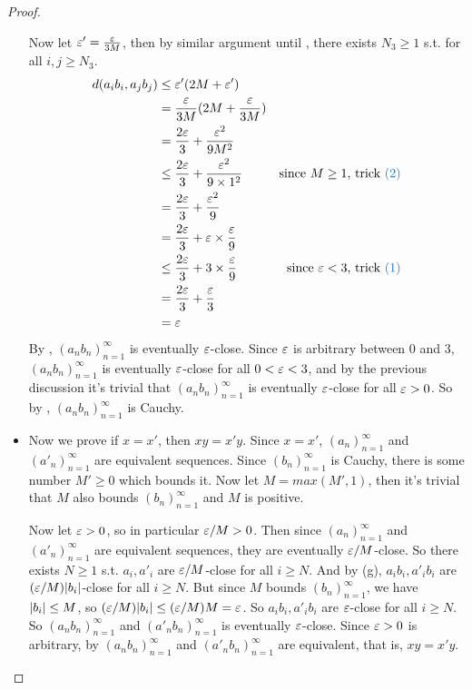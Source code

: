 \begin{proof}
\begin{itemize}
        \sloppy Now let \(\varepsilon' = \frac{\varepsilon}{3M}\), then by similar argument until ,
        there exists \(N_3 \ge 1\) s.t. for all \(i, j \ge N_3\).
        \begin{align*}
            d(a_i b_i, a_j b_j) & \le \varE'(2M + \varE') \\
                                & = \frac{\varE}{3M}(2M + \frac{\varE}{3M}) \\
                                & = \frac{2\varE}{3} + \frac{\varE^2}{9M^2} \\
                                & \le \frac{2\varE}{3} + \frac{\varE^2}{9\X1^2} & \text{since \(M \ge 1\), trick \BLUE{(2)}} \\
                                & = \frac{2\varE}{3} + \frac{\varE^2}{9} \\
                                & = \frac{2\varE}{3} + \varE \X \frac{\varE}{9} \\
                                & \le \frac{2\varE}{3} + 3 \X \frac{\varE}{9} & \text{since \(\varE < 3\), trick \BLUE{(1)}} \\
                                & = \frac{2\varE}{3} + \frac{\varE}{3} \\
                                & = \varE
        \end{align*}
        By , \((a_n b_n)_{n = 1}^{\infty}\) is eventually \(\varepsilon\)-close.
        Since \(\varepsilon\) is arbitrary between \(0\) and \(3\), \((a_n b_n)_{n = 1}^{\infty}\) is eventually \(\varepsilon\)-close for all \(0 < \varepsilon < 3\),
        and by the previous discussion it's trivial that \((a_n b_n)_{n = 1}^{\infty}\) is eventually \(\varepsilon\)-close for all \(\varepsilon > 0\).
        So by , \((a_n b_n)_{n = 1}^{\infty}\) is Cauchy.
    \item
        Now we prove if \(x = x'\), then \(xy = x'y\).
        Since \(x = x'\), \((a_n)_{n = 1}^\infty\) and \((a'_n)_{n = 1}^\infty\) are equivalent sequences.
        Since \((b_n)_{n = 1}^\infty\) is Cauchy, there is some number \(M' \ge 0\) which bounds it.
        Now let \(M = max(M', 1)\), then it's trivial that \(M\) also bounds \((b_n)_{n = 1}^\infty\) and \(M\) is positive.

        Now let \(\varepsilon > 0\), so in particular \(\varepsilon/M > 0\).
        Then since \((a_n)_{n=1}^\infty\) and \((a'_n)_{n=1}^\infty\) are equivalent sequences, they are eventually \(\varepsilon/M\)-close.
        So there exists \(N \ge 1\) s.t. \(a_i, a'_i\) are \(\varepsilon/M\)-close for all \(i \ge N\).
        And by (g), \(a_i b_i, a'_i b_i\) are \((\varepsilon/M)\lvert b_i\rvert\)-close for all \(i \ge N\).
        But since \(M\) bounds \((b_n)_{n = 1}^\infty\), we have \(\lvert b_i\rvert \le M\), so \((\varepsilon/M)\lvert b_i\rvert \le (\varepsilon/M)M = \varepsilon\).
        So \(a_i b_i, a'_i b_i\) are \(\varepsilon\)-close for all \(i \ge N\).
        So \((a_n b_n)_{n = 1}^\infty\) and \((a'_n b_n)_{n = 1}^\infty\) is eventually \(\varepsilon\)-close.
        Since \(\varepsilon > 0\) is arbitrary, by  \((a_n b_n)_{n = 1}^\infty\) and \((a'_n b_n)_{n = 1}^\infty\) are equivalent, that is, \(xy = x'y\).
\end{itemize}

\end{proof}

